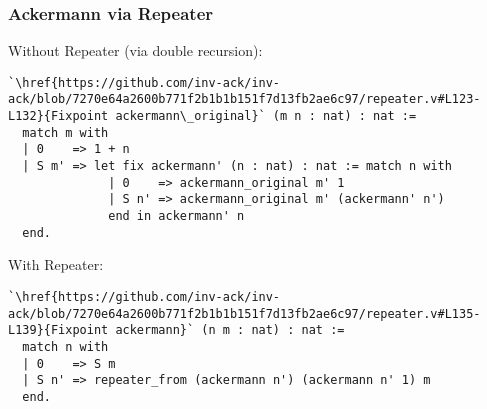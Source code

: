 \begin{frame}[fragile]
\frametitle{Ackermann via Repeater}
Without Repeater (via double recursion):
\begin{lstlisting}
`\href{https://github.com/inv-ack/inv-ack/blob/7270e64a2600b771f2b1b1b151f7d13fb2ae6c97/repeater.v#L123-L132}{Fixpoint ackermann\_original}` (m n : nat) : nat :=
  match m with
  | 0    => 1 + n
  | S m' => let fix ackermann' (n : nat) : nat := match n with
              | 0    => ackermann_original m' 1
              | S n' => ackermann_original m' (ackermann' n')
              end in ackermann' n
  end.
\end{lstlisting}

\pause 
With Repeater:
\begin{lstlisting}
`\href{https://github.com/inv-ack/inv-ack/blob/7270e64a2600b771f2b1b1b151f7d13fb2ae6c97/repeater.v#L135-L139}{Fixpoint ackermann}` (n m : nat) : nat :=
  match n with
  | 0    => S m
  | S n' => repeater_from (ackermann n') (ackermann n' 1) m
  end.
\end{lstlisting}
\end{frame}

%
